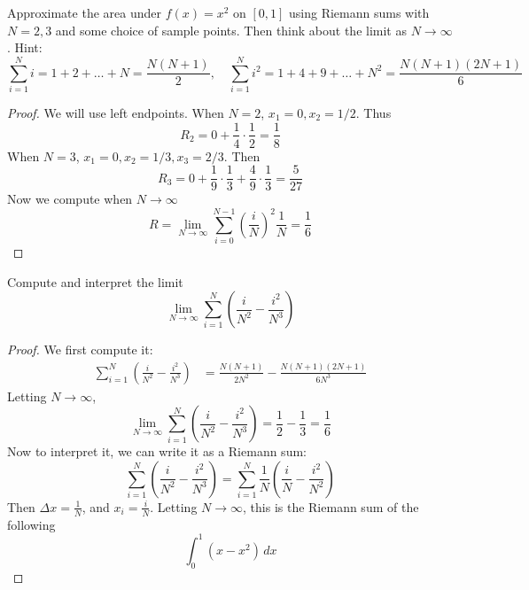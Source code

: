 \documentclass[openany]{book}
\begin{document}
\begin{prob}
    Approximate the area under $f(x)=x^2$
    on $[0,1]$ using Riemann sums with $N=2,3$
    and some choice of sample points. Then think about the limit as $N\to\infty$. Hint: 
    \begin{equation*}
        \sum_{i=1}^N i=1+2+\dots+N=\frac{N(N+1)}{2}, \quad \sum_{i=1}^N i^2=1+4+9+\dots+N^2=\frac{N(N+1)(2N+1)}{6}
    \end{equation*}
\end{prob}
\begin{proof}
    We will use left endpoints. When $N=2$, $x_1=0, x_2=1/2$. Thus 
    \begin{equation*}
        R_2=0+\frac{1}{4}\cdot\frac{1}{2}=\frac{1}{8}
    \end{equation*}
    When $N=3$, $x_1=0, x_2=1/3, x_3=2/3$. Then 
    \begin{equation*}
        R_3=0+\frac{1}{9}\cdot\frac{1}{3}+\frac{4}{9}\cdot\frac{1}{3}=\frac{5}{27}
    \end{equation*}
    Now we compute when $N\to\infty$ 
    \begin{equation*}
        R=\lim_{N\to\infty}\sum_{i=0}^{N-1}\left(\frac{i}{N}\right)^2\frac{1}{N}=\frac{1}{6}
    \end{equation*}
\end{proof}



\begin{prob}
    Compute and interpret the limit
    \[
    \lim_{N\to\infty}
    \sum_{i=1}^{N}
    \left(
        \frac{i}{N^2}
        -
        \frac{i^2}{N^3}
    \right)
    \]
\end{prob}
\begin{proof}
     We first compute it:
    \begin{align}
        \sum_{i=1}^{N}
    \left(
        \frac{i}{N^2}
        -
        \frac{i^2}{N^3}
    \right)&=\frac{N(N+1)}{2N^2}-\frac{N(N+1)(2N+1)}{6N^3}
    \end{align}
    Letting $N\to\infty$, 
    \begin{equation*}
        \lim_{N\to\infty}
    \sum_{i=1}^{N}
    \left(
        \frac{i}{N^2}
        -
        \frac{i^2}{N^3}
    \right)=\frac{1}{2}-\frac{1}{3}=\frac{1}{6}
    \end{equation*}
    Now to interpret it, we can write it as a Riemann sum:
    \begin{equation*}
        \sum_{i=1}^{N}
    \left(
        \frac{i}{N^2}
        -
        \frac{i^2}{N^3}
    \right)=\sum_{i=1}^N\frac{1}{N}\left(\frac{i}{N}-\frac{i^2}{N^2}\right)
    \end{equation*}
    Then $\Delta x=\frac{1}{N}$, and $x_i=\frac{i}{N}$. Letting $N\to\infty$, this is the Riemann sum of the following
    \begin{equation*}
        \int_0^1 (x-x^2)\,dx
    \end{equation*}
\end{proof}
\end{document}
